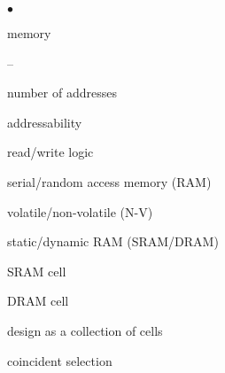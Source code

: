 \begin{minipage}[t]{2.75in}
\begin{list}{$\bullet$}{\setlength{\itemsep}{0pt}\setlength{\parskip}{0pt}%
\setlength{\topsep}{0pt}\setlength{\partopsep}{0pt}\setlength{\parsep}{0pt}}
\item{memory
\begin{list}{--}{\setlength{\itemsep}{0pt}\setlength{\parskip}{0pt}%
\setlength{\topsep}{0pt}\setlength{\partopsep}{0pt}\setlength{\parsep}{0pt}}
\item number of addresses
\item addressability
\item read/write logic
\item serial/random access memory (RAM)
\item volatile/non-volatile (N-V)
\item static/dynamic RAM (SRAM/DRAM)
\item SRAM cell
\item DRAM cell
\item design as a collection of cells
\item coincident selection
\end{list}
}

\end{list}
\end{minipage}\hfill%
